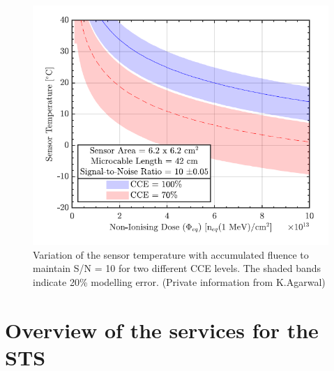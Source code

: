 \begin{figure}[!h]
\centering
\includegraphics[width=0.7\columnwidth]{Chapter2/images/SN.png}
\caption{Variation of the sensor temperature with accumulated fluence to maintain S/N = 10 for two different CCE levels. The shaded bands indicate 20\% modelling error. (Private information from K.Agarwal)}
\label{fig_cce_temp}
\end{figure}



\section{Overview of the services for the STS}

